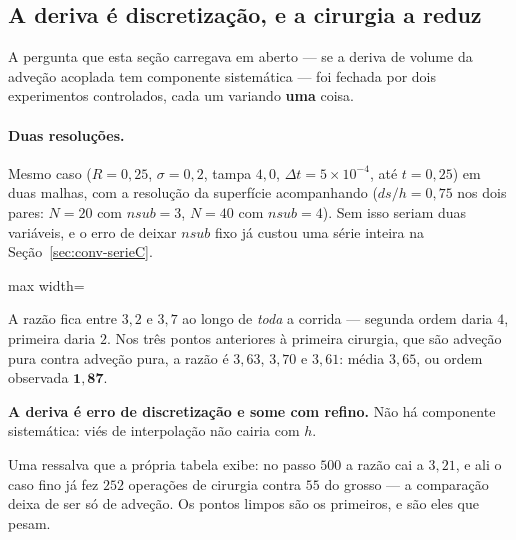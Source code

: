 \subsection{A deriva \'e discretiza\c{c}\~ao, e a cirurgia a reduz}
\label{sec:tridim-duasres}

A pergunta que esta se\c{c}\~ao carregava em aberto --- se a deriva de volume da
adve\c{c}\~ao acoplada tem componente sistem\'atica --- foi fechada por dois
experimentos controlados, cada um variando \textbf{uma} coisa.

\paragraph{Duas resolu\c{c}\~oes.} Mesmo caso ($R=0{,}25$, $\sigma=0{,}2$, tampa
$4{,}0$, $\Delta t = 5\times10^{-4}$, at\'e $t=0{,}25$) em duas malhas, com a
resolu\c{c}\~ao da superf\'icie acompanhando ($ds/h = 0{,}75$ nos dois pares:
$N=20$ com $nsub=3$, $N=40$ com $nsub=4$). Sem isso seriam duas vari\'aveis, e o
erro de deixar $nsub$ fixo j\'a custou uma s\'erie inteira na
Se\c{c}\~ao~\ref{sec:conv-serieC}.

\begin{adjustbox}{max width=\linewidth}
\end{adjustbox}

A raz\~ao fica entre $3{,}2$ e $3{,}7$ ao longo de \emph{toda} a corrida ---
segunda ordem daria $4$, primeira daria $2$. Nos tr\^es pontos anteriores \`a
primeira cirurgia, que s\~ao adve\c{c}\~ao pura contra adve\c{c}\~ao pura, a
raz\~ao \'e $3{,}63$, $3{,}70$ e $3{,}61$: m\'edia $3{,}65$, ou ordem observada
$\mathbf{1{,}87}$.

\textbf{A deriva \'e erro de discretiza\c{c}\~ao e some com refino.} N\~ao h\'a
componente sistem\'atica: vi\'es de interpola\c{c}\~ao n\~ao cairia com $h$.

Uma ressalva que a pr\'opria tabela exibe: no passo $500$ a raz\~ao cai a
$3{,}21$, e ali o caso fino j\'a fez $252$ opera\c{c}\~oes de cirurgia contra
$55$ do grosso --- a compara\c{c}\~ao deixa de ser s\'o de adve\c{c}\~ao. Os
pontos limpos s\~ao os primeiros, e s\~ao eles que pesam.

